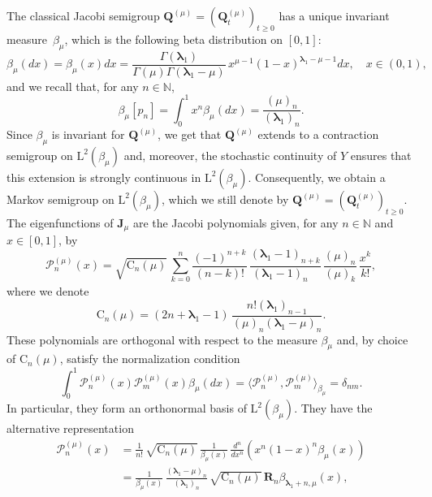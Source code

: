 \documentclass[JEP,XML,SOM,Unicode]{cedram}
\theoremstyle{plain}
\theoremstyle{definition}
\newcommand{\N}{\mathbb{N}}
\renewcommand{\P}{\mathcal{P}}
\newcommand{\Rc}{\mathbf{R}}
\newcommand{\C}{{\mathrm{C}}}
\newcommand{\Leb}{\mathrm{L}}
\newcommand{\calJd}{\mathbf{J}}
\newcommand{\lam}{{\bm{\lambda}_1}}
\newcommand{\Q}[1][\mo]{\mathbf{Q}^{({#1})}}
\newcommand{\gab}[1][\lam,\mo]{{\beta_{#1}}}
\let\mo\mu
\begin{document}
\begin{appendix}
The classical Jacobi semigroup $\Q\!=\!(\Q_t)_{t \geq 0}$ has a unique invariant measure~$\gab[\mo]$, which is the
following beta distribution on $[0,1]$:\vspace*{-3pt}
\begin{equation}
\label{eq:def_beta}
\gab[\mo](dx) = \gab[\mo](x)dx =\frac{\Gamma(\lam)}{\Gamma(\mo)\Gamma(\lam-\mo)}\,x^{\mo-1}(1-x)^{\lam-\mo- 1}dx, \quad x \in (0,1),
\end{equation}
and we recall that, for any $n\in \mathbb{N}$,\vspace*{-3pt}
\begin{equation}
\label{eq:beta-moments}
\gab[\mo][p_n] = \int_0^1 x^n\gab[\mo](dx)= \frac{(\mo)_n}{(\lam)_n}.
\end{equation}
Since $\gab[\mo]$ is invariant for $\Q$, we get that $\Q$ extends to a contraction semigroup on $\Leb^2(\gab[\mo])$ and, moreover, the stochastic continuity of $Y$ ensures that this extension is strongly continuous in $\Leb^2(\gab[\mo])$. Consequently, we obtain a Markov semigroup on $\Leb^2(\gab[\mo])$, which we still denote by $\Q = (\Q_t)_{t \geq 0}$. The eigenfunctions of $\calJd_\mo$ are the Jacobi polynomials given, for any $n \in \N$ and $x \in [0,1]$, by
\begin{equation}
\label{J_pol}
\P_n^{(\mo)} (x) = \sqrt{\C_n(\mo)}\, \sum_{k=0}^n \frac{(-1)^{n+k}}{(n-k)!}\, \frac{(\lam-1)_{n+k}}{(\lam-1)_{n\phantom{+k}}}\, \frac{(\mo)_n}{(\mo)_k}\, \frac{x^k}{k!},
\end{equation}
where we denote
\begin{equation}
\label{eq:Cn-lam-mo}
\C_n(\mo)=(2n+\lam-1)\,\frac{n!(\lam)_{n-1}}{(\mo)_n(\lam-\mo)_n}.
\end{equation}
These polynomials are orthogonal with respect to the measure $\gab[\mo]$ and, by choice of $\C_n(\mo)$, satisfy the normalization condition
\begin{equation*}
\int_0^1 \P_n^{(\mo)}(x) \P_m^{(\mo)}(x) \gab[\mo](dx) = \langle \P_n^{(\mo)}, \P_m^{(\mo)}\rangle_{\gab[\mo]} = \delta_{nm}.
\end{equation*}
In particular, they form an orthonormal basis of $\Leb^2(\gab[\mo])$. They have the alternative representation
\begin{align}
\P_n^{(\mo)}(x) &= \frac{1}{n!}\, \sqrt{\C_n(\mo)}\, \frac{1}{\gab[\mo](x)}\, \frac{d^n}{dx^n}\left(x^n(1-x)^n \gab[\mo](x)\right) \nonumber \\
\label{eq:Jac-Rod}
&= \frac{1}{\gab[\mo](x)}\, \frac{(\lam-\mo)_n}{(\lam)_n}\, \sqrt{\C_n(\mo)}\, \Rc_{n} \gab[\lam+n,\mo](x),

\end{align}
\end{appendix}
\end{document}
